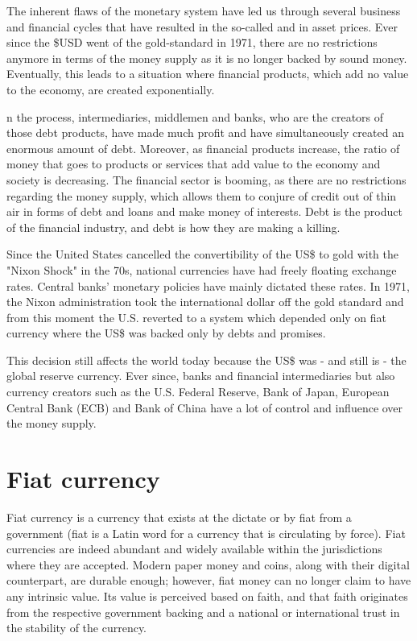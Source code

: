 The inherent flaws of the monetary system have led us through several business and financial cycles that have resulted in the so-called  and  in asset prices. Ever since the \$USD went of the gold-standard in 1971, there are no restrictions anymore in terms of the money supply as it is no longer backed by sound money. Eventually, this leads to a situation where financial products, which add no value to the economy, are created exponentially.


n the process, intermediaries, middlemen and banks, who are the creators of those debt products, have made much profit and have simultaneously created an enormous amount of debt. Moreover, as financial products increase, the ratio of money that goes to products or services that add value to the economy and society is decreasing. The financial sector is booming, as there are no restrictions regarding the money supply, which allows them to conjure of credit out of thin air in forms of debt and loans and make money of interests. Debt is the product of the financial industry, and debt is how they are making a killing.



    \begin{tcolorbox}
    [enhanced,
    title=Nixon shock - off the gold standard,
    frame style=
    {left color=orange!85!black,right color=yellow!95!black}]
    
      Since the United States cancelled the convertibility of the US\$ to gold with the "Nixon Shock" in the 70s, national currencies have had freely floating exchange rates. Central banks' monetary policies have mainly dictated these rates. In 1971, the Nixon administration took the international dollar off the gold standard and from this moment the U.S. reverted to a system which depended only on fiat currency where the US\$ was backed only by debts and promises. 
\end{tcolorbox}
\medskip

This decision still affects the world today because the US\$ was - and still is - the global reserve currency. Ever since, banks and financial intermediaries but also currency creators such as the U.S. Federal Reserve, Bank of Japan, European Central Bank (ECB) and Bank of China have a lot of control and influence over the money supply. 

\section{Fiat currency}       
Fiat currency is a currency that exists at the dictate or by fiat from a government (fiat is a Latin word for a currency that is circulating by force). Fiat currencies are indeed abundant and widely available within the jurisdictions where they are accepted. Modern paper money and coins, along with their digital counterpart, are durable enough; however, fiat money can no longer claim to have any intrinsic value. Its value is perceived based on faith, and that faith originates from the respective government backing and a national or international trust in the stability of the currency.

